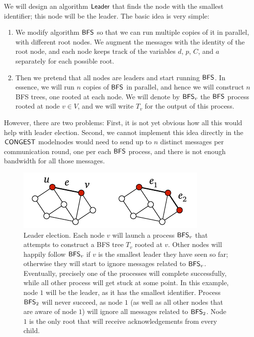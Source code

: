 We will design an algorithm $\textup{\sffamily Leader}$ that finds the node with the smallest identifier; this node will be the leader. The basic idea is very simple:
\begin{enumerate}
    \item We modify algorithm $\textup{\sffamily BFS}$ so that we can run multiple copies of it in parallel, with different root nodes. We augment the messages with the identity of the root node, and each node keeps track of the variables $d$, $p$, $C$, and $a$ separately for each possible root.
    \item Then we pretend that all nodes are leaders and start running $\textup{\sffamily BFS}$. In essence, we will run $n$ copies of $\textup{\sffamily BFS}$ in parallel, and hence we will construct $n$ BFS trees, one rooted at each node. We will denote by $\textup{\sffamily BFS}_v$ the $\textup{\sffamily BFS}$ process rooted at node $v \in V$, and we will write $T_v$ for the output of this process.
\end{enumerate}
However, there are two problems: First, it is not yet obvious how all this would help with leader election. Second, we cannot implement this idea directly in the $\textup{\sffamily CONGEST}$ model\mydash nodes would need to send up to $n$ distinct messages per communication round, one per each $\textup{\sffamily BFS}$ process, and there is not enough bandwidth for all those messages.

\begin{figure}
    \centering
    \includegraphics[page=\PLeader]{figs.pdf}
    \caption{Leader election. Each node $v$ will launch a process $\textup{\sffamily BFS}_v$ that attempts to construct a BFS tree $T_v$ rooted at $v$. Other nodes will happily follow $\textup{\sffamily BFS}_v$ if $v$ is the smallest leader they have seen so far; otherwise they will start to ignore messages related to $\textup{\sffamily BFS}_v$. Eventually, precisely one of the processes will complete successfully, while all other process will get stuck at some point. In this example, node $1$ will be the leader, as it has the smallest identifier. Process $\textup{\sffamily BFS}_2$ will never succeed, as node $1$ (as well as all other nodes that are aware of node $1$) will ignore all messages related to $\textup{\sffamily BFS}_2$. Node $1$ is the only root that will receive acknowledgements from every child.}\label{fig:leader}
\end{figure}

